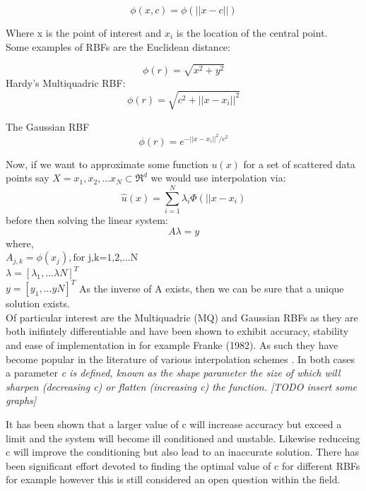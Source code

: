 \documentclass[a4paper]{amsart}
\begin{document}
\begin{equation}
\phi(x,c) = \phi(||x-c||)
\end{equation}

Where x is the point of interest and $x_{i}$ is the location of the central point. \\Some examples of RBFs are the Euclidean distance:

\begin{equation}
\phi(r) = \sqrt{x^{2} + y^{2}}
\end{equation}
Hardy's Multiquadric RBF:
\begin{equation}
\phi(r) = \sqrt{c^{2} + ||x-x_{i}||^{2}}
\end{equation}

The Gaussian RBF
\begin{equation}
\phi(r) = e^{-||x-x_{i}||^{2} / c^{2}}
\end{equation}

Now, if we want to approximate some function $u(x)$ for a set of scattered data points say $X={x_{1},x_{2},...x_{N}} \subset \Re^{d}$ we would use interpolation via:
\begin{equation}
\hat u(x) = \sum^{N}_{i=1} \lambda_{i} \Phi(||x - x_{i})
\label{RBFA}
\end{equation}
before then solving the linear system:
\begin{equation}
A\lambda =y
\end{equation}
where,
\\ $A_{j,k}= \phi(x_{j}), \mbox{for j,k=1,2,...N}$
\\$\lambda=[\lambda_{1},...\lambda{N}]^{T}$
\\$y=[y_{1},...y{N}]^{T}$
As the inverse of A exists, then we can be sure that a unique solution exists.\\

Of particular interest are the Multiquadric (MQ) and Gaussian RBFs as they are both inifintely differentiable and have been shown to exhibit accuracy, stability and ease of implementation in for example Franke (1982)\cite{rbf3}. As such they have become popular in the literature of various interpolation schemes \cite{rbf4}. In both cases a parameter \em{c} is defined, known as the \em{shape parameter} the size of which will sharpen (decreasing c) or flatten (increasing c) the function.
[TODO insert some graphs]

It has been shown that a larger value of c will increase accuracy but exceed a limit and the system will become ill conditioned and unstable. Likewise reduceing c will improve the conditioning but also lead to an inaccurate solution. There has been significant effort devoted to finding the optimal value of c for different RBFs for example \cite{} however this is still considered an open question within the field.
\end{document}
